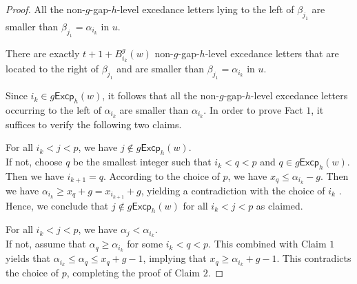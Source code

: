 \documentclass[10pt,a4paper]{amsart}
\def\Excp{\mathsf{Excp}}
\begin{document}
\begin{proof}
 All the non-$g$-gap-$h$-level excedance letters lying  to the left of $\beta_{j_{1}}$ are smaller than    $\beta_{j_{1}}=\alpha_{i_k}$ in $u$.
 
   There are exactly $t+1+B^g_{i_k}(w)$ non-$g$-gap-$h$-level excedance letters that are located to the right of $\beta_{j_{1}}$ and   are smaller than  $\beta_{j_{1}}=\alpha_{i_k}$ in $u$.
  
 
  Since $i_k\in g\Excp_{h}(w)$,  it follows that all the non-$g$-gap-$h$-level excedance letters occurring  to the left of $\alpha_{i_{k}}$  are smaller than $\alpha_{i_k}$.  In order to prove Fact $1$, it suffices  to verify the following two claims. 
  
   For all $i_k<j<p$, we have $j\notin g\Excp_h(w)$.\\
   If not,  choose $q$ be the smallest  integer such that $i_k<q<p$ and 
  $q\in g\Excp_h(w)$.  Then we have $i_{k+1}=q$. According to the choice of $p$, we have $x_q\leq \alpha_{i_k}-g$. Then we have $\alpha_{i_k}\geq x_q+g=x_{i_{k+1}}+g$,  yielding a contradiction with the choice of $i_k$ .  Hence, we conclude that $j\notin g\Excp_{h}(w)$ for all $i_k<j<p$ as claimed.
  
   For all  $i_k<j<p$, we have $\alpha_j< \alpha_{i_k}$. \\
  If not, assume that $\alpha_q\geq \alpha_{i_k}$ for some $i_k<q<p$.  This combined with Claim  $1$ yields that  $\alpha_{i_k}\leq \alpha_q\leq x_{q}+g-1$, implying  that $x_q\geq \alpha_{i_k}+g-1$. This contradicts     the choice of $p$, completing  the proof of Claim $2$. 
  

\end{proof}
\end{document}
